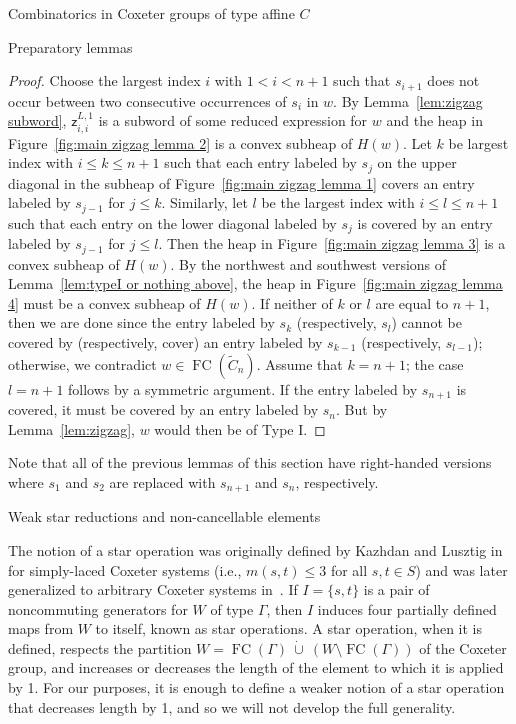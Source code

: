 \documentclass[11pt]{amsart}
\theoremstyle{definition}
\numberwithin{equation}{section}
\newcommand{\C}{\widetilde{C}}
\newcommand{\z}{\mathsf{z}}
\renewcommand{\(}{\left(}
\renewcommand{\)}{\right)}
\DeclareMathOperator{\FC}{FC}
\begin{document}
\begin{section}{Combinatorics in Coxeter groups of type affine $C$}
\begin{subsection}{Preparatory lemmas}
\begin{proof}
Choose the largest index $i$ with $1<i<n+1$ such that $s_{i+1}$ does not occur between two consecutive occurrences of $s_{i}$ in $w$.  By Lemma~\ref{lem:zigzag subword}, $\z_{i,i}^{L,1}$ is a subword of some reduced expression for $w$ and the heap in Figure~\ref{fig:main zigzag lemma 2} is a convex subheap of $H(w)$.  Let $k$ be largest index with $i\leq k \leq n+1$ such that each entry labeled by $s_{j}$ on the upper diagonal in the subheap of Figure~\ref{fig:main zigzag lemma 1} covers an entry labeled by $s_{j-1}$ for $j\leq k$.  Similarly, let $l$ be the largest index with $i\leq l \leq n+1$ such that each entry on the lower diagonal labeled by $s_{j}$ is covered by an entry labeled by $s_{j-1}$ for $j\leq l$.  Then the heap in Figure~\ref{fig:main zigzag lemma 3} is a convex subheap of $H(w)$.  By the northwest and southwest versions of Lemma~\ref{lem:typeI or nothing above}, the heap in Figure~\ref{fig:main zigzag lemma 4} must be a convex subheap of $H(w)$.  If neither of $k$ or $l$ are equal to $n+1$, then we are done since the entry labeled by $s_{k}$ (respectively, $s_{l}$) cannot be covered by (respectively, cover) an entry labeled by $s_{k-1}$ (respectively, $s_{l-1}$); otherwise, we contradict $w \in \FC(\C_{n})$.  Assume that $k=n+1$; the case $l=n+1$ follows by a symmetric argument.  If the entry labeled by $s_{n+1}$ is covered, it must be covered by an entry labeled by $s_{n}$.  But by Lemma~\ref{lem:zigzag}, $w$ would then be of Type I.
\end{proof}

Note that all of the previous lemmas of this section have right-handed versions where $s_{1}$ and $s_{2}$ are replaced with $s_{n+1}$ and $s_{n}$, respectively.

\end{subsection}


\begin{subsection}{Weak star reductions and non-cancellable elements}\label{subsec:weak star}

The notion of a star operation was originally defined by Kazhdan and Lusztig in~\cite[]{Kazhdan1979} for simply-laced Coxeter systems (i.e., $m(s,t)\leq3$ for all $s,t \in S$) and was later generalized to arbitrary Coxeter systems in~\cite[]{Lusztig1985}.  If $I=\{s,t\}$ is a pair of noncommuting generators for $W$ of type $\Gamma$, then $I$ induces four partially defined maps from $W$ to itself, known as star operations. A star operation, when it is defined, respects the partition $W = \FC(\Gamma)\ \dot{\cup}\  (W \setminus \FC(\Gamma) )$ of the Coxeter group, and increases or decreases the length of the element to which it is applied by 1.  For our purposes, it is enough to define a weaker notion of a star operation that decreases length by 1, and so we will not develop the full generality.  


\end{subsection}
\end{section}
\end{document}
